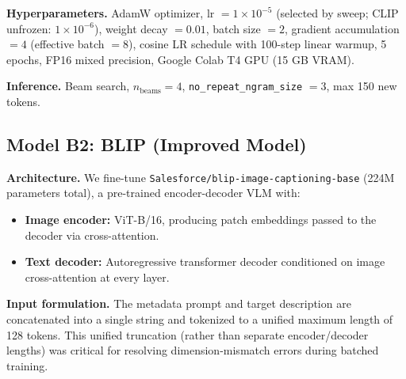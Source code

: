 \documentclass[12pt,a4paper]{article}
\begin{document}
\textbf{Hyperparameters.} AdamW optimizer, lr $= 1 \times 10^{-5}$ (selected by
sweep; CLIP unfrozen: $1 \times 10^{-6}$), weight decay $= 0.01$, batch size $= 2$,
gradient accumulation $= 4$ (effective batch $= 8$), cosine LR schedule with 100-step
linear warmup, 5 epochs, FP16 mixed precision, Google Colab T4 GPU (15 GB VRAM).

\textbf{Inference.} Beam search, $n_{\text{beams}} = 4$, \texttt{no\_repeat\_ngram\_size}
$= 3$, max 150 new tokens.

\subsection{Model B2: BLIP (Improved Model)}

\textbf{Architecture.} We fine-tune \texttt{Salesforce/blip-image-captioning-base}
(224M parameters total), a pre-trained encoder-decoder VLM with:
\begin{itemize}[noitemsep]
  \item \textbf{Image encoder:} ViT-B/16, producing patch embeddings passed to the
        decoder via cross-attention.
  \item \textbf{Text decoder:} Autoregressive transformer decoder conditioned on
        image cross-attention at every layer.
\end{itemize}

\textbf{Input formulation.} The metadata prompt and target description are concatenated
into a single string and tokenized to a unified maximum length of 128 tokens. This
unified truncation (rather than separate encoder/decoder lengths) was critical for
resolving dimension-mismatch errors during batched training.
\end{document}
